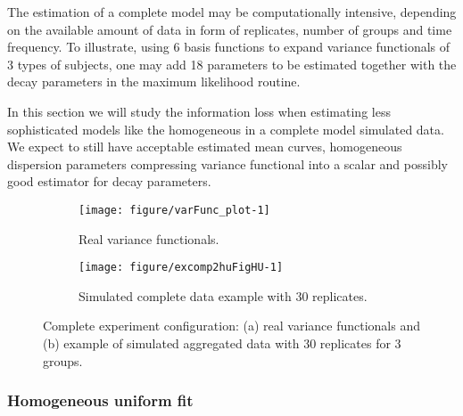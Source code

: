 The estimation of a complete model may be computationally intensive, depending on the available  amount of data in form of replicates, number of groups and time frequency. To illustrate, using 6 basis functions to expand variance functionals of 3 types of subjects, one may add 18 parameters to be estimated together with the decay parameters in the maximum likelihood routine.

In this section we will study the information loss when estimating less sophisticated models like the homogeneous in a complete model simulated data. We expect to still have acceptable estimated mean  curves, homogeneous dispersion parameters compressing variance functional into a scalar and possibly good estimator for decay parameters.


\begin{figure}[!t]
  \begin{subfigure}{\textwidth}
    \centering
\begin{knitrout}
\color{fgcolor}
\texttt{[image: figure/varFunc\_plot-1]} 

\end{knitrout}
    \caption{Real variance functionals.} \label{fig:varfunc-simu}
  \end{subfigure}
  \begin{subfigure}{\textwidth}
    \centering
\begin{knitrout}
\color{fgcolor}
\texttt{[image: figure/excomp2huFigHU-1]} 

\end{knitrout}
    \caption{Simulated complete data example with 30 replicates.}
  \end{subfigure}
  \caption{Complete experiment configuration: (a) real variance functionals and (b) example of simulated aggregated data with 30 replicates for 3 groups.}
  \label{fig:comp-data}
\end{figure}




\subsubsection{Homogeneous uniform fit}
\label{sec:comp2hu}



